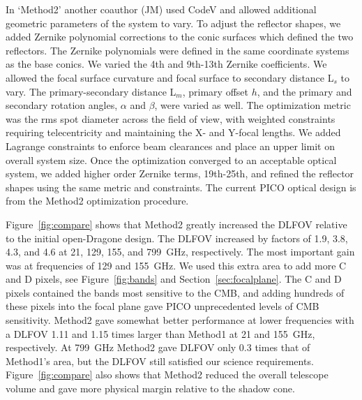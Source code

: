 \documentclass[]{spie}  %
\newcommand{\comr}[1]{\textcolor{red}{#1}}
\begin{document}
In `Method2' another coauthor (JM) used 
CodeV and allowed additional geometric parameters of the system to vary.  To adjust the 
reflector shapes, we added Zernike polynomial corrections to the conic surfaces which defined the two reflectors.
The Zernike polynomials were defined in the same coordinate systems as the base conics.  
We varied the 4th and 9th-13th Zernike coefficients. We allowed the focal surface curvature 
and focal surface to secondary distance L$_s$ to vary.  The primary-secondary distance L$_m$, primary offset $h$, 
and the primary and secondary rotation angles, $\alpha$ and $\beta$, were varied as well.  The optimization 
metric was the rms spot diameter across the field of view, with weighted constraints requiring telecentricity and 
maintaining the X- and Y-focal lengths.  We added Lagrange constraints 
to enforce beam clearances and place an upper limit on overall system size.  Once the optimization converged to 
an acceptable optical system, we added higher order Zernike terms, 19th-25th, and refined 
the reflector shapes using the same metric and constraints. 
The current PICO optical design is from the Method2 optimization procedure.  %

Figure~\ref{fig:compare} shows that Method2 greatly increased the DLFOV relative to the initial open-Dragone design.  
The DLFOV increased by factors of 1.9, 3.8, 4.3, and 4.6 at 21, 129, 155, and 799~GHz, respectively.  
The most important gain was at frequencies of 129 and 155~GHz. We used this extra area to add 
more C and D pixels, see Figure~\ref{fig:bands} and Section~\ref{sec:focalplane}. The C and D pixels contained the bands 
most sensitive to the CMB, and adding hundreds of these pixels into the focal plane  
gave PICO unprecedented levels of CMB sensitivity. 
Method2 gave somewhat better performance at lower 
frequencies with a DLFOV 1.11 and 1.15 times larger than Method1 at 21 and 155~GHz, respectively.
At 799~GHz Method2 gave DLFOV only 0.3 times that of Method1's area, but the DLFOV still satisfied our science 
requirements. 
Figure~\ref{fig:compare} also shows that Method2 reduced the overall telescope volume and gave more 
physical margin relative to the shadow cone.
\end{document}
